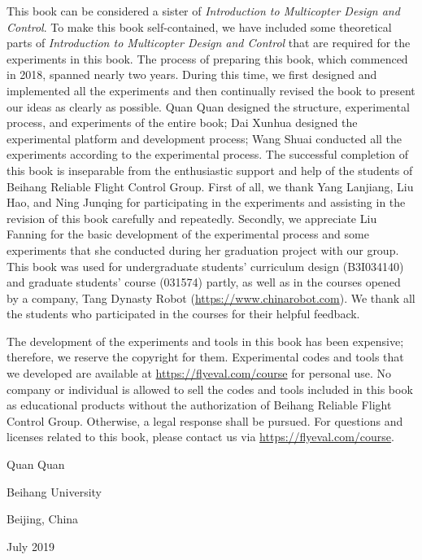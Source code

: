 This book can be considered a sister of \textit{Introduction to Multicopter
Design and Control}. To make this book self-contained, we have included
some theoretical parts of \textit{Introduction to Multicopter Design
and Control} that are required for the experiments in this book. The
process of preparing this book, which commenced in 2018, spanned nearly
two years. During this time, we first designed and implemented all
the experiments and then continually revised the book to present our
ideas as clearly as possible. Quan Quan designed the structure, experimental
process, and experiments of the entire book; Dai Xunhua designed the
experimental platform and development process; Wang Shuai conducted
all the experiments according to the experimental process. The successful
completion of this book is inseparable from the enthusiastic support
and help of the students of Beihang Reliable Flight Control Group.
First of all, we thank Yang Lanjiang, Liu Hao, and Ning Junqing for
participating in the experiments and assisting in the revision of
this book carefully and repeatedly. Secondly, we appreciate Liu Fanning
for the basic development of the experimental process and some experiments
that she conducted during her graduation project with our group. This
book was used for undergraduate students' curriculum design (B3I034140)
and graduate students' course (031574) partly, as well as in the courses
opened by a company, Tang Dynasty Robot (\url{https://www.chinarobot.com}).
We thank all the students who participated in the courses for their
helpful feedback.

The development of the experiments and tools in this book has been
expensive; therefore, we reserve the copyright for them. Experimental
codes and tools that we developed are available at \url{https://flyeval.com/course}
for personal use. No company or individual is allowed to sell the
codes and tools included in this book as educational products without
the authorization of Beihang Reliable Flight Control Group. Otherwise,
a legal response shall be pursued. For questions and licenses related
to this book, please contact us via \url{https://flyeval.com/course}.

\qquad{}\qquad{}\qquad{}\qquad{}\qquad{}\qquad{}\qquad{}\qquad{}\qquad{}\qquad{}\qquad{}\qquad{}\qquad{}\qquad{}Quan
Quan

\qquad{}\qquad{}\qquad{}\qquad{}\qquad{}\qquad{}\qquad{}\qquad{}\qquad{}\qquad{}\qquad{}\qquad{}\qquad{}\qquad{}Beihang
University  

\qquad{}\qquad{}\qquad{}\qquad{}\qquad{}\qquad{}\qquad{}\qquad{}\qquad{}\qquad{}\qquad{}\qquad{}\qquad{}\qquad{}Beijing,
China 

\qquad{}\qquad{}\qquad{}\qquad{}\qquad{}\qquad{}\qquad{}\qquad{}\qquad{}\qquad{}\qquad{}\qquad{}\qquad{}\qquad{}July
2019
